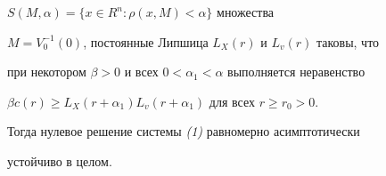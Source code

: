 \begin{thm}
\begin{itemize}
$S(M,\alpha)=\{x\in R^n:\rho(x,M)<\alpha\}$ множества 


$M=V_0^{-1}(0)$, постоянные Липшица $L_X(r)$ и $L_v(r)$ таковы, что 


при некотором $\beta>0$ и всех $0<\alpha_1<\alpha$ выполняется неравенство 


$\beta c(r)\ge L_X(r+\alpha_1)L_v(r+\alpha_1)$ для всех $r\ge r_0>0$. 


\end{itemize} 


 


Тогда нулевое решение системы {\em (1)} равномерно асимптотически 


устойчиво в целом. 


\end{thm}


 


